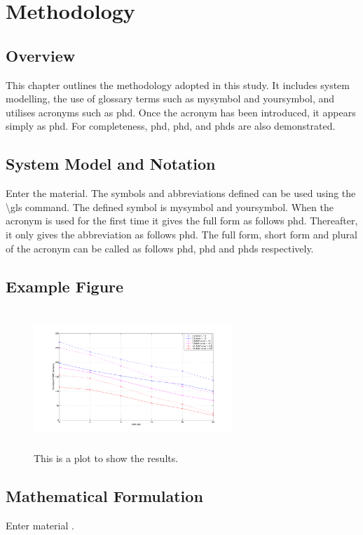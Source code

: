 \chapter{Methodology}

\section{Overview}
This chapter outlines the methodology adopted in this study. It includes system modelling, the use of glossary terms such as \gls{mysymbol} and \gls{yoursymbol}, and utilises acronyms such as \gls{phd}. Once the acronym has been introduced, it appears simply as \gls{phd}. For completeness, \acrfull{phd}, \acrshort{phd}, and \glspl{phd} are also demonstrated.

\section{System Model and Notation}
{Enter the material. The symbols and abbreviations defined can be used using the \textbackslash gls command. The defined symbol is \gls{mysymbol} and \gls{yoursymbol}. When the acronym is used for the first time it gives the full form as follows \gls{phd}. Thereafter, it only gives the abbreviation as follows \gls{phd}. The full form, short form and plural of the acronym can be called as follows \acrfull{phd}, \acrshort{phd} and \glspl{phd} respectively.}

\section{Example Figure}
\begin{figure}[!ht]
\centering
\includegraphics[width=7.5cm, height=5.26cm]{Images/plot.pdf}
\caption{This is a plot to show the results.}
\label{fig:Plot}
\end{figure}

\section{Mathematical Formulation}
{Enter material \cite{Zhang2004}.}

